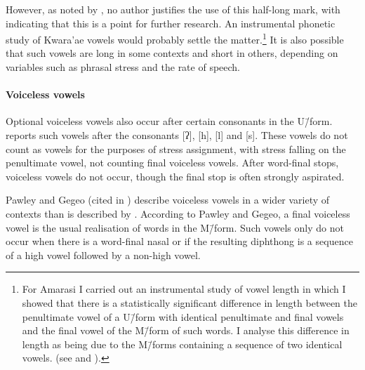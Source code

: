 However, as noted by \citet[25]{he04},
no author justifies the use of this half-long mark,
with \citeauthor{he04} indicating that this is a point for further research.
An instrumental phonetic study of Kwara'ae vowels
would probably settle the matter.\footnote{
		For Amarasi I carried out an instrumental study of vowel length
		in which I showed that there is a statistically significant
		difference in length between the penultimate vowel of a U\=/form
		with identical penultimate and final vowels and the final
		vowel of the M\=/form of such words.
		I analyse this difference in length as being due to the M\=/forms
		containing a sequence of two identical vowels.
		(see  and ).}
It is also possible that such vowels are long in some contexts and short in others,
depending on variables such as phrasal stress and the rate of speech.

\paragraph{Voiceless vowels}\label{sec:KwaVoiVow}
Optional voiceless vowels also occur after certain consonants in the U\=/form.
\citet[19]{he04} reports such vowels after the consonants [ʔ], [h], [l] and [s].
These vowels do not count as vowels for the purposes of stress assignment,
with stress falling on the penultimate vowel, not counting final voiceless vowels.
After word-final stops, voiceless vowels do not occur,
though the final stop is often strongly aspirated.

\begin{exe}
	\label{KwvoicelessVH}
\end{exe}

Pawley and Gegeo (cited in \citealt{blga98})
describe voiceless vowels in a wider variety of contexts than is described by \citet{he04}.
According to Pawley and Gegeo, a final voiceless vowel is the usual realisation of words in the M\=/form.
Such vowels only do not occur when there is a word-final nasal
or if the resulting diphthong is a sequence of a high vowel followed by a non-high vowel.

